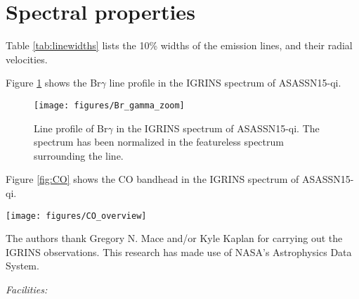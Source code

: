 \documentclass[iop,revtex4]{emulateapj}%
\newcommand{\name}{ASASSN15-qi}
\begin{document}
\section{Spectral properties}\label{sec:lines}

Table \ref{tab:linewidths} lists the 10\% widths of the emission lines, and their radial velocities.



Figure \ref{fig:BrG} shows the Br$\gamma$ line profile in the IGRINS spectrum of \name.  

\begin{figure}
	\centering
	\texttt{[image: figures/Br\_gamma\_zoom]} 
	\caption{Line profile of Br$\gamma$ in the IGRINS spectrum of \name.  The spectrum has been normalized in the featureless spectrum surrounding the line.}
	\label{fig:BrG}
\end{figure}

Figure \ref{fig:CO} shows the CO bandhead in the IGRINS spectrum of \name.

\begin{figure*}
	\centering
	\texttt{[image: figures/CO\_overview]} 
	\caption{CO bandhead in the IGRINS spectrum of \name.  The spectrum shows instrumental artifacts attributable to imperfectly corrected echelle blaze function.  Imperfect telluric correction is perceptible as conspicuous outliers present throughout the spectrum.  The red line is the SpeX spectrum of K0 Ib supergiant HD~44391 shown to guide the eye to the location of typical CO absorption in a stellar photosphere.  The emission in \name~  is seen \emph{in emission}.  }
	\label{fig:CO}
\end{figure*}


\acknowledgements
The authors thank Gregory N. Mace and/or Kyle Kaplan for carrying out the IGRINS observations. This research has made use of NASA's Astrophysics Data System.

{\it Facilities:} 

\clearpage



\end{document}
